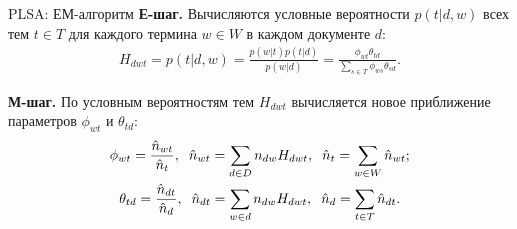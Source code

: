 \documentclass[unicode,9pt, pdf]{beamer}
\begin{document}
   \begin{frame}{PLSA: ЕМ-алгоритм}
   \textbf{Е-шаг.} Вычисляются условные вероятности $p(t|d, w)$ всех тем $t \in T$ для каждого термина $w \in W$ в каждом документе $d$:
   \begin{gather*}
       H_{d w t} = p(t|d, w) = \frac{p(w|t) p(t|d)}{p(w|d)} = \frac{\phi_{w t} \theta_{t d}}{\sum_{s \in T} \phi_{w s} \theta_{s d}}.
   \end{gather*}
   
   \textbf{М-шаг.} По условным вероятностям тем $H_{d w t}$ вычисляется новое приближение параметров $\phi_{w t}$ и $\theta_{t d}$:
 \begin{gather*}
    \phi_{w t} = \frac{\hat{n}_{w t}}{\hat{n}_t}, \hspace{0.2 cm} \hat{n}_{w t} = \sum_{d \in D}n_{d w} H_{d w t}, \hspace{0.2 cm}  \hat{n}_t = \sum_{w \in W}\hat{n}_{w t};\\
    \theta_{t d} = \frac{\hat{n}_{d t}}{\hat{n}_d}, \hspace{0.2 cm}  \hat{n}_{d t} = \sum_{w \in d} n_{d w} H_{d w t}, \hspace{0.2 cm}  \hat{n}_d = \sum_{t \in T} \hat{n}_{d t}.
\end{gather*}



       
   \end{frame}
   
\end{document}
